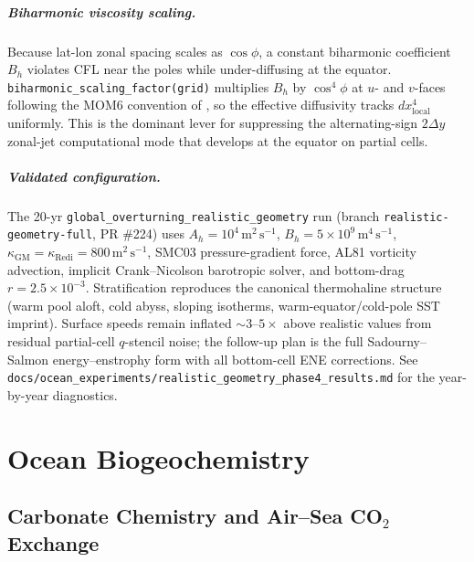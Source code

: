 \documentclass[11pt,twoside]{report}
\begin{document}
\paragraph{Biharmonic viscosity scaling.}
Because lat-lon zonal spacing scales as $\cos\phi$, a constant
biharmonic coefficient $B_h$ violates CFL near the poles while
under-diffusing at the equator.
\texttt{biharmonic\_scaling\_factor(grid)} multiplies $B_h$ by
$\cos^4\phi$ at $u$- and $v$-faces following the MOM6 convention of
\citet{GriffiesHallberg2000}, so the effective diffusivity tracks
$dx^4_{\mathrm{local}}$ uniformly.  This is the dominant lever for
suppressing the alternating-sign $2\Delta y$ zonal-jet computational
mode that develops at the equator on partial cells.

\paragraph{Validated configuration.}
The 20-yr \texttt{global\_overturning\_realistic\_geometry} run
(branch \texttt{realistic-geometry-full}, PR \#224) uses
$A_h = 10^4\,\mathrm{m^2\,s^{-1}}$,
$B_h = 5{\times}10^9\,\mathrm{m^4\,s^{-1}}$,
$\kappa_{\mathrm{GM}} = \kappa_{\mathrm{Redi}} = 800\,\mathrm{m^2\,s^{-1}}$,
SMC03 pressure-gradient force, AL81 vorticity advection, implicit
Crank--Nicolson barotropic solver, and bottom-drag $r=2.5{\times}10^{-3}$.
Stratification reproduces the canonical thermohaline structure (warm
pool aloft, cold abyss, sloping isotherms, warm-equator/cold-pole SST
imprint).  Surface speeds remain inflated ${\sim}3$--$5\times$ above
realistic values from residual partial-cell $q$-stencil noise; the
follow-up plan is the full Sadourny--Salmon energy--enstrophy form
with all bottom-cell ENE corrections.  See
\texttt{docs/ocean\_experiments/realistic\_geometry\_phase4\_results.md}
for the year-by-year diagnostics.


\chapter{Ocean Biogeochemistry}
\label{ch:bgc}

\section{Carbonate Chemistry and Air--Sea CO$_2$ Exchange}
\end{document}
